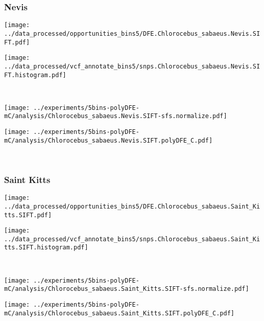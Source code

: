 \subsubsection{Nevis}

\begin{minipage}{0.49\linewidth}
    \texttt{[image: ../data\_processed/opportunities\_bins5/DFE.Chlorocebus\_sabaeus.Nevis.SIFT.pdf]}
\end{minipage}
\begin{minipage}{0.49\linewidth}
    \texttt{[image: ../data\_processed/vcf\_annotate\_bins5/snps.Chlorocebus\_sabaeus.Nevis.SIFT.histogram.pdf]}
\end{minipage}
\\
\begin{minipage}{0.49\linewidth}
    \texttt{[image: ../experiments/5bins-polyDFE-mC/analysis/Chlorocebus\_sabaeus.Nevis.SIFT-sfs.normalize.pdf]}
\end{minipage}
\begin{minipage}{0.49\linewidth}
    \texttt{[image: ../experiments/5bins-polyDFE-mC/analysis/Chlorocebus\_sabaeus.Nevis.SIFT.polyDFE\_C.pdf]}
\end{minipage}
\\

\subsubsection{Saint Kitts}

\begin{minipage}{0.49\linewidth}
    \texttt{[image: ../data\_processed/opportunities\_bins5/DFE.Chlorocebus\_sabaeus.Saint\_Kitts.SIFT.pdf]}
\end{minipage}
\begin{minipage}{0.49\linewidth}
    \texttt{[image: ../data\_processed/vcf\_annotate\_bins5/snps.Chlorocebus\_sabaeus.Saint\_Kitts.SIFT.histogram.pdf]}
\end{minipage}
\\
\begin{minipage}{0.49\linewidth}
    \texttt{[image: ../experiments/5bins-polyDFE-mC/analysis/Chlorocebus\_sabaeus.Saint\_Kitts.SIFT-sfs.normalize.pdf]}
\end{minipage}
\begin{minipage}{0.49\linewidth}
    \texttt{[image: ../experiments/5bins-polyDFE-mC/analysis/Chlorocebus\_sabaeus.Saint\_Kitts.SIFT.polyDFE\_C.pdf]}
\end{minipage}
\\

